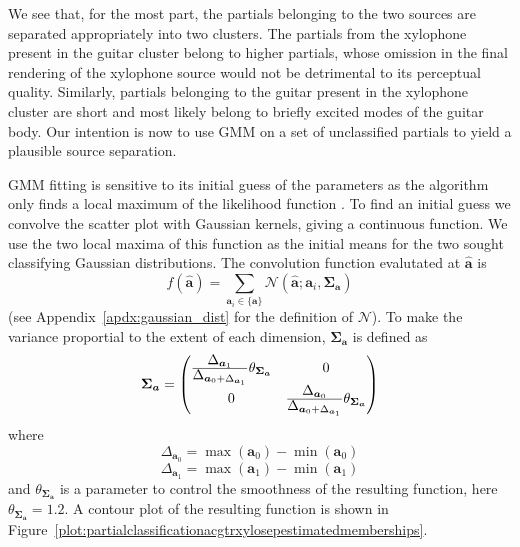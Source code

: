 We see that, for the most part, the partials belonging to the two sources are
separated appropriately into two clusters. The partials from the xylophone
present in the guitar cluster belong to higher partials, whose omission in the
final rendering of the xylophone source would not be detrimental to its
perceptual quality. Similarly, partials belonging to the guitar present in the
xylophone cluster are short and most likely belong to briefly excited modes
of the guitar body. Our intention is now to use GMM on a set of unclassified
partials to yield a plausible source separation.

GMM fitting is sensitive to its initial guess of the parameters as the algorithm
only finds a local maximum of the likelihood function
\cite[p.~187]{kay1993fundamentals}.
To find an initial guess we convolve the scatter plot with Gaussian kernels,
giving a continuous function. We use the two local maxima of this function as
the initial means for the two sought classifying Gaussian distributions. The
convolution function evalutated at $\boldsymbol{\hat{a}}$ is
\[
    f(\boldsymbol{\hat{a}}) = \sum_{\boldsymbol{a}_i \in \{\boldsymbol{a}\}}
    \mathcal{N} \left( \boldsymbol{\hat{a}} ; \boldsymbol{a}_i,
    \boldsymbol{\Sigma}_{\boldsymbol{a}} \right)
\]
(see
Appendix~\ref{apdx:gaussian_dist} for the definition of $\mathcal{N}$).
To make the variance proportial to the extent of each dimension,
$\boldsymbol{\Sigma}_{\boldsymbol{a}}$ is defined as
\[
    \boldsymbol{\Sigma}_{\boldsymbol{a}}
    =
    \begin{pmatrix}
        \frac{\displaystyle\Delta_{\boldsymbol{a}_1}}{\displaystyle\Delta_{\boldsymbol{a}_0
        +\Delta_{\boldsymbol{a}_1}}}
            \theta_{\boldsymbol{\Sigma_{\boldsymbol{a}}}}
        & 0 \\
        0 & \frac{\displaystyle\Delta_{\boldsymbol{a}_0}}{\displaystyle\Delta_{\boldsymbol{a}_0
    +\Delta_{\boldsymbol{a}_1}}}
            \theta_{\boldsymbol{\Sigma_{\boldsymbol{a}}}}
    \end{pmatrix}
\]
where
\[
    \Delta_{\boldsymbol{a}_0} = \max \left( \boldsymbol{a}_0 \right)
        - \min \left( \boldsymbol{a}_0 \right)
\]
\[
    \Delta_{\boldsymbol{a}_1} = \max \left( \boldsymbol{a}_1 \right)
        - \min \left( \boldsymbol{a}_1 \right)
\]
and $\theta_{\boldsymbol{\Sigma_{\boldsymbol{a}}}}$ is a parameter to control
the smoothness of the resulting function, here
$\theta_{\boldsymbol{\Sigma_{\boldsymbol{a}}}} = 1.2$. A contour plot of the
resulting function is shown in
Figure~\ref{plot:partialclassificationacgtrxylosepestimatedmemberships}.

